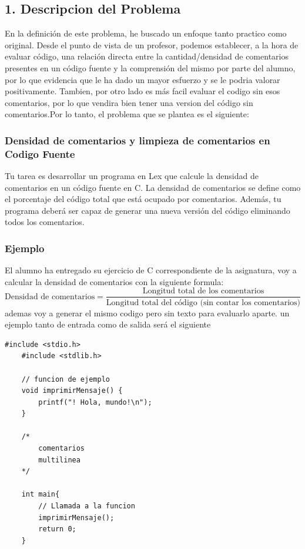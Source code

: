 \documentclass{article}
\begin{document}
        \newpage

        \subsection*{1. Descripcion del Problema}
        
        En la definición de este problema, he buscado un enfoque tanto practico como original. Desde el punto de vista de un profesor, podemos establecer, a la hora de evaluar código, una relación directa entre la cantidad/densidad de comentarios presentes en un  código fuente y la comprensión del mismo por parte del alumno, por lo que evidencia que le ha dado un mayor esfuerzo y se le podria valorar positivamente. Tambien, por otro lado es más facil evaluar el codigo sin esos comentarios, por lo que vendira bien tener una version  del código sin comentarios.Por lo tanto, el problema que se plantea es el siguiente:
    
        \subsubsection*{Densidad de comentarios y limpieza de comentarios en Codigo Fuente
        }
        Tu tarea es desarrollar un programa en Lex que calcule la densidad de comentarios en un código fuente en C. La densidad de comentarios se define como el porcentaje del código total que está ocupado por comentarios. Además, tu programa deberá ser capaz de generar una nueva versión del código eliminando todos los comentarios.


        \subsubsection*{Ejemplo}
        El alumno ha entregado su ejercicio de C correspondiente de la asignatura, voy a calcular la densidad de comentarios con la siguiente formula: 
        \[ \text{{Densidad de comentarios}} = \frac{{\text{{Longitud total de los comentarios}}}}{{\text{{Longitud total del código (sin contar los comentarios)}}}} \]
        \vspace{\baselineskip} %
        ademas voy a generar el mismo codigo pero sin texto para evaluarlo aparte.
        un ejemplo tanto de entrada como de salida será el siguiente
        
        \newpage

    
        \lstset{language=C, breaklines=true, basicstyle=\footnotesize}
        \begin{lstlisting}[frame=single]
    #include <stdio.h>
    #include <stdlib.h>
            
    // funcion de ejemplo
    void imprimirMensaje() {
        printf("! Hola, mundo!\n");
    }

    /*
        comentarios
        multilinea
    */

    int main{
        // Llamada a la funcion
        imprimirMensaje();
        return 0;
    }
    \end{lstlisting}



    
\end{document}
